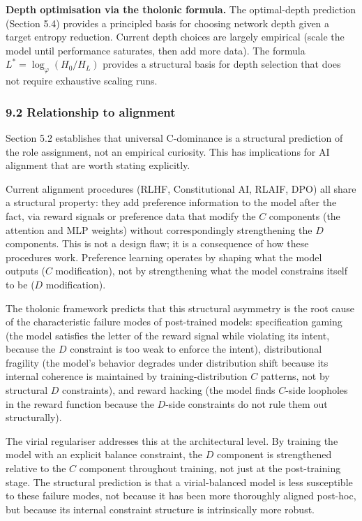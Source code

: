 \documentclass[
  11pt,
  letterpaper,
]{article}
\begin{document}
\textbf{Depth optimisation via the tholonic formula.} The optimal-depth
prediction (Section 5.4) provides a principled basis for choosing
network depth given a target entropy reduction. Current depth choices
are largely empirical (scale the model until performance saturates, then
add more data). The formula \(L^* = \log_\varphi(H_0/H_L)\) provides a
structural basis for depth selection that does not require exhaustive
scaling runs.

\subsubsection{9.2 Relationship to
alignment}\label{relationship-to-alignment}

Section 5.2 establishes that universal C-dominance is a structural
prediction of the role assignment, not an empirical curiosity. This has
implications for AI alignment that are worth stating explicitly.

Current alignment procedures (RLHF, Constitutional AI, RLAIF, DPO) all
share a structural property: they add preference information to the
model after the fact, via reward signals or preference data that modify
the \(C\) components (the attention and MLP weights) without
correspondingly strengthening the \(D\) components. This is not a design
flaw; it is a consequence of how these procedures work. Preference
learning operates by shaping what the model outputs (\(C\)
modification), not by strengthening what the model constrains itself to
be (\(D\) modification).

The tholonic framework predicts that this structural asymmetry is the
root cause of the characteristic failure modes of post-trained models:
specification gaming (the model satisfies the letter of the reward
signal while violating its intent, because the \(D\) constraint is too
weak to enforce the intent), distributional fragility (the model's
behavior degrades under distribution shift because its internal
coherence is maintained by training-distribution \(C\) patterns, not by
structural \(D\) constraints), and reward hacking (the model finds
\(C\)-side loopholes in the reward function because the \(D\)-side
constraints do not rule them out structurally).

The virial regulariser addresses this at the architectural level. By
training the model with an explicit balance constraint, the \(D\)
component is strengthened relative to the \(C\) component throughout
training, not just at the post-training stage. The structural prediction
is that a virial-balanced model is less susceptible to these failure
modes, not because it has been more thoroughly aligned post-hoc, but
because its internal constraint structure is intrinsically more robust.
\end{document}
